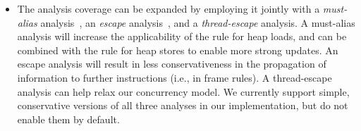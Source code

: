 \begin{itemize}

\item
  The analysis coverage can be expanded by employing it jointly with a
  \emph{must-alias} analysis~\cite{mattmight:Jagannathan:1998:Single,dvanhorn:choi-etal-popl93,popl/ZhengR08}, an \emph{escape} analysis~\cite{mattmight:Blanchet:1998:Escape,Deutsch:1997:CEA:263699.263750}, and a
  \emph{thread-escape} analysis. A must-alias analysis will increase
  the applicability of the rule for heap loads, and can be combined
  with the rule for heap stores to enable more strong updates. An
  escape analysis will result in less conservativeness in the
  propagation of information to further instructions (i.e., in frame
  rules). A thread-escape analysis can help relax our concurrency
  model. We currently support simple, conservative versions of all
  three analyses in our implementation, but do not enable them by default.

  



%



\end{itemize}
